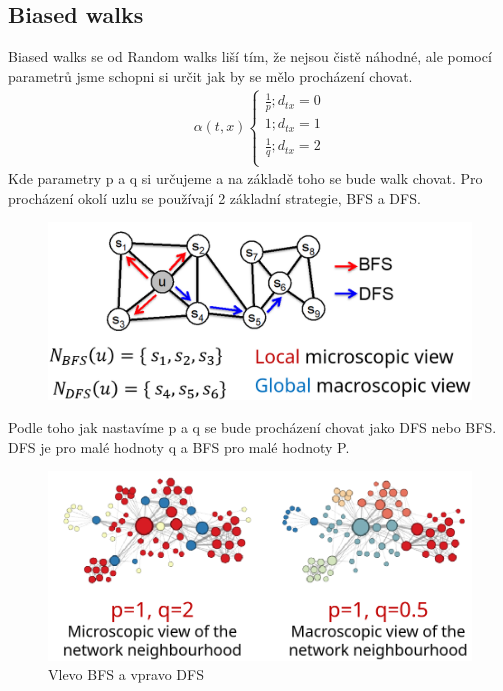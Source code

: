 \subsection{Biased walks}
Biased walks se od Random walks liší tím, že nejsou čistě náhodné, ale pomocí parametrů jsme schopni si určit jak by se mělo procházení chovat.\\
\begin{gather*}
    \alpha(t,x)
    \begin{cases}
        \frac{1}{p}; d_{tx} = 0\\
        1; d_{tx} = 1\\
        \frac{1}{q}; d_{tx} = 2\\
    \end{cases}
\end{gather*}
Kde parametry p a q si určujeme a na základě toho se bude walk chovat. Pro procházení okolí uzlu se používají 2 základní strategie, BFS a DFS.\\
\begin{figure}[ht]
    \centering
    \includegraphics[scale = 0.3]{images/BiasWalk.png}
\end{figure}
\newline
Podle toho jak nastavíme p a q se bude procházení chovat jako DFS nebo BFS. DFS je pro malé hodnoty q a BFS pro malé hodnoty P.\\
\begin{figure}[ht]
    \centering
    \includegraphics[scale = 0.4]{images/BFSvsDFS.png}
    \caption{Vlevo BFS a vpravo DFS}
\end{figure}